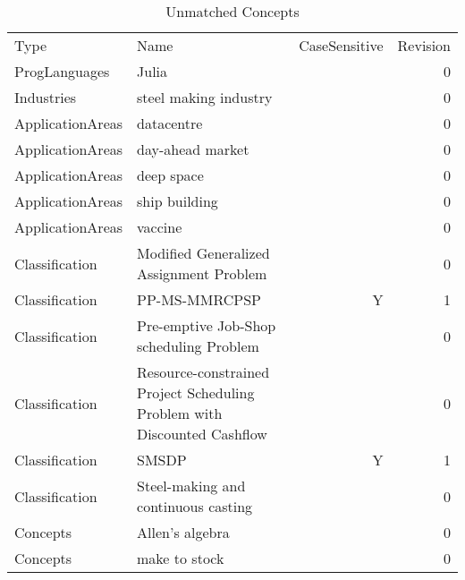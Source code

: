 {\scriptsize
\begin{longtable}{lp{10cm}rr}
\rowcolor{white}\caption{Unmatched Concepts}\\ \toprule
\rowcolor{white}Type & Name & CaseSensitive & Revision\\ \midrule
\endhead
\bottomrule
\endfoot
ProgLanguages & Julia &  & 0\\Industries & steel making industry &  & 0\\ApplicationAreas & datacentre &  & 0\\ApplicationAreas & day-ahead market &  & 0\\ApplicationAreas & deep space &  & 0\\ApplicationAreas & ship building &  & 0\\ApplicationAreas & vaccine &  & 0\\Classification & Modified Generalized Assignment Problem &  & 0\\Classification & PP-MS-MMRCPSP & Y & 1\\Classification & Pre-emptive Job-Shop scheduling Problem &  & 0\\Classification & Resource-constrained Project Scheduling Problem with Discounted Cashflow &  & 0\\Classification & SMSDP & Y & 1\\Classification & Steel-making and continuous casting &  & 0\\Concepts & Allen's algebra &  & 0\\Concepts & make to stock &  & 0\\\end{longtable}
}

